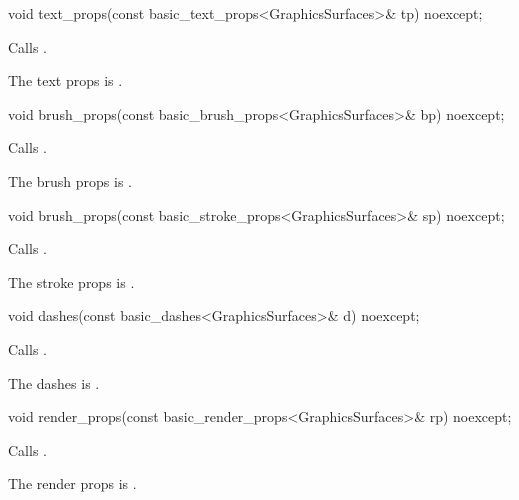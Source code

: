 %
\begin{itemdecl}
void text_props(const basic_text_props<GraphicsSurfaces>& tp) noexcept;
\end{itemdecl}
\begin{itemdescr}
\pnum
\effects Calls .

\pnum
\remarks The text props is .
\end{itemdescr}

%
\begin{itemdecl}
void brush_props(const basic_brush_props<GraphicsSurfaces>& bp) noexcept;
\end{itemdecl}
\begin{itemdescr}
\pnum
\effects Calls .

\pnum
\remarks The brush props is .
\end{itemdescr}

%
\begin{itemdecl}
void brush_props(const basic_stroke_props<GraphicsSurfaces>& sp) noexcept;
\end{itemdecl}
\begin{itemdescr}
\pnum
\effects Calls .

\pnum
\remarks The stroke props is .
\end{itemdescr}

%
\begin{itemdecl}
void dashes(const basic_dashes<GraphicsSurfaces>& d) noexcept;
\end{itemdecl}
\begin{itemdescr}
\pnum
\effects Calls .

\pnum
\remarks The dashes is .
\end{itemdescr}

%
\begin{itemdecl}
void render_props(const basic_render_props<GraphicsSurfaces>& rp) noexcept;
\end{itemdecl}
\begin{itemdescr}
\pnum
\effects Calls .

\pnum
\remarks The render props is .
\end{itemdescr}


